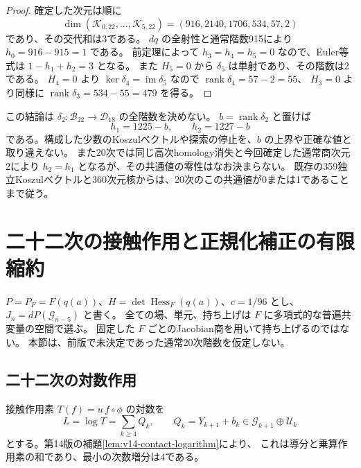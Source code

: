 \begin{proof}
確定した次元は順に
\[
 \dim(\mathcal K_{0,22},\ldots,\mathcal K_{5,22})
   =(916,2140,1706,534,57,2)
\]
であり、その交代和は3である。
$dq$ の全射性と通常階数915により $h_0=916-915=1$ である。
前定理によって $h_3=h_4=h_5=0$ なので、Euler等式は
$1-h_1+h_2=3$ となる。
また $H_5=0$ から $\delta_5$ は単射であり、その階数は2である。
$H_4=0$ より $\ker\delta_4=\operatorname{im}\delta_5$ なので
$\operatorname{rank}\delta_4=57-2=55$、
$H_3=0$ より同様に $\operatorname{rank}\delta_3=534-55=479$ を得る。
\end{proof}

\begin{remark}[まだ決まらない階数]
この結論は $\delta_2:\mathcal B_{22}\to\mathcal D_{18}$ の全階数を決めない。
$b=\operatorname{rank}\delta_2$ と置けば
\[
 h_1=1225-b,\qquad h_2=1227-b
\]
である。構成した少数のKoszulベクトルや探索の停止を、$b$ の上界や正確な値と取り違えない。
また20次では同じ高次homology消失と今回確定した通常商次元2により
$h_2=h_1$ となるが、その共通値の零性はなお決まらない。
既存の359独立Koszulベクトルと360次元核からは、20次のこの共通値が0または1であることまで従う。
\end{remark}





\section{二十二次の接触作用と正規化補正の有限縮約}
\label{sec:v16-contact-twenty-second}

$P=P_F=F(q(a))$、$H=\det\operatorname{Hess}_F(q(a))$、$c=1/96$ とし、
$J_n=dP(\mathcal G_{n-5})$ と書く。
全ての場、単元、持ち上げは $F$ に多項式的な普遍共変量の空間で選ぶ。
固定した $F$ ごとのJacobian商を用いて持ち上げるのではない。
本節は、前版で未決定であった通常20次階数を仮定しない。

\subsection{二十二次の対数作用}

接触作用素 $T(f)=u\,f\circ\phi$ の対数を
\[
 L=\log T=\sum_{k\ge4}Q_k,\qquad
 Q_k=Y_{k+1}+b_k\in\mathcal G_{k+1}\oplus\mathcal U_k
\]
とする。第14版の補題\ref{lem:v14-contact-logarithm}により、
これは導分と乗算作用素の和であり、最小の次数増分は4である。

